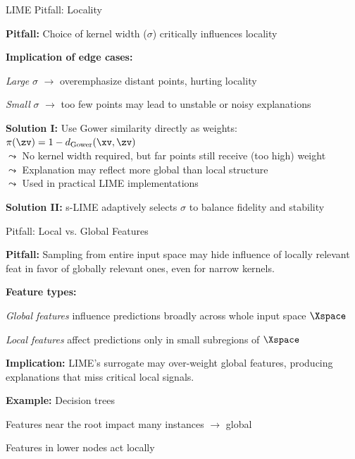 \documentclass[10pt,compress,t,notes=noshow, xcolor=table]{beamer}
\begin{document}
\begin{framei}[align=top]{LIME Pitfall: Locality }
\item \textbf{Pitfall:} Choice of kernel width ($\sigma$) critically influences locality
\pause
\item \textbf{Implication of edge cases:}
\begin{itemizeS}
\item \emph{Large} $\sigma$ $\rightarrow$ overemphasize distant points, hurting locality
\item \emph{Small} $\sigma$ $\rightarrow$ too few points may lead to unstable or noisy explanations
\end{itemizeS}
\pause
\item \textbf{Solution I:} Use Gower similarity directly as weights: $\pi(\zv) = 1 - d_{\text{Gower}}(\xv, \zv)$\\
$\leadsto$ No kernel width required, but far points still receive (too high) weight\\
$\leadsto$ Explanation may reflect more global than local structure\\
$\leadsto$ Used in practical LIME implementations 
\pause
\item \textbf{Solution II:} s-LIME adaptively selects $\sigma$ to balance fidelity and stability 
\end{framei}


\begin{framei}[align=top]{Pitfall: Local vs. Global Features }
\item<1-> \textbf{Pitfall:} Sampling from entire input space may hide influence of locally relevant feat in favor of globally relevant ones, even for narrow kernels.
\item<1-> \textbf{Feature types:}
\begin{itemizeS}
\item \emph{Global features} influence predictions broadly across whole input space $\Xspace$
\item \emph{Local features} affect predictions only in small subregions of $\Xspace$
\end{itemizeS}
\item<2-> \textbf{Implication:} LIME’s surrogate may over-weight global features, producing explanations that miss critical local signals.
\item<3-> \textbf{Example:} Decision trees
\begin{itemizeS}
\item Features near the root impact many instances $\rightarrow$ global
\item Features in lower nodes act locally
\end{itemizeS}
\end{framei}
\end{document}
